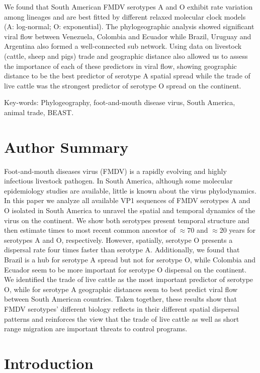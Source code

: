\documentclass[10pt]{article}
\begin{document}
We found that South American FMDV serotypes A and O exhibit rate variation among lineages and are best fitted by different relaxed molecular clock models (A: log-normal; O: exponential).
The phylogeographic analysis showed significant viral flow between Venezuela, Colombia and Ecuador while Brazil, Uruguay and Argentina also formed a well-connected sub network.
Using data on livestock (cattle, sheep and pigs) trade and geographic distance also allowed us to assess the importance of each of these predictors in viral flow, showing geographic distance to be the best predictor of serotype A spatial spread while the trade of live cattle was the strongest predictor of serotype O spread on the continent.

Key-words: Phylogeography, foot-and-mouth disease virus, South America, animal trade, BEAST.

\section*{Author Summary} %
Foot-and-mouth diseases virus (FMDV) is a rapidly evolving and highly infectious livestock pathogen.
In South America, although some molecular epidemiology studies are available, little is known about the virus phylodynamics.
In this paper we analyze all available VP1 sequences of FMDV serotypes A and O isolated in South America to unravel the spatial and temporal dynamics of the virus on the continent.
We show both serotypes present temporal structure and then estimate times to most recent common ancestor of $\approx 70$ and $\approx 20$ years for serotypes A and O, respectively. 
However, spatially, serotype O presents a dispersal rate four times faster than serotype A.
Additionally, we found that Brazil is a hub for serotype A spread but not for serotype O, while Colombia and Ecuador seem to be more important for serotype O dispersal on the continent.
We identified the trade of live cattle as the most important predictor of serotype O, while for serotype A geographic distances seem to best predict viral flow between South American countries.
Taken together, these results show that FMDV serotypes' different biology reflects in their different spatial dispersal patterns and reinforces the view that the trade of live cattle as well as short range migration are important threats to control programs.   

\section*{Introduction}
\end{document}
